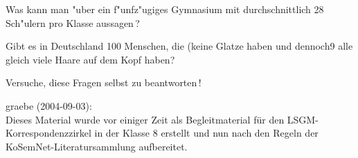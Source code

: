 \documentclass[11pt]{article}
\begin{document}
\begin{aufgabe}
  Was kann man "uber ein f"unfz"ugiges Gymnasium mit durchschnittlich 28
  Sch"ulern pro Klasse aussagen\,?
\end{aufgabe}

\begin{aufgabe}
  Gibt es in Deutschland 100 Menschen, die (keine Glatze haben und dennoch9
  alle gleich viele Haare auf dem Kopf haben?
\end{aufgabe}

Versuche, diese Fragen selbst zu beantworten\,!

\begin{attribution}
graebe (2004-09-03):\\ Dieses Material wurde vor einiger Zeit als
Begleitmaterial für den LSGM-Korrespondenzzirkel in der Klasse 8 erstellt und
nun nach den Regeln der KoSemNet-Literatursammlung aufbereitet.
\end{attribution}
\end{document}
